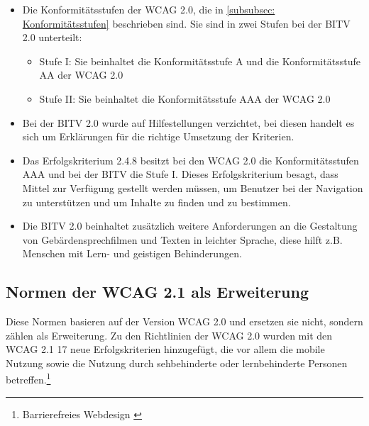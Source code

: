 \begin{itemize}
	\item Die Konformitätsstufen der \ac{WCAG} 2.0, die in \cref{subsubsec: Konformitätsstufen} beschrieben sind. Sie sind in zwei Stufen bei 
	der \ac{BITV} 2.0 unterteilt:
		\begin{itemize}
			\item Stufe I: Sie beinhaltet die Konformitätsstufe A und die Konformitätsstufe AA der \ac{WCAG} 2.0
			\item Stufe II: Sie beinhaltet die Konformitätsstufe AAA der \ac{WCAG} 2.0
		\end{itemize}
	
	\item Bei der \ac{BITV} 2.0 wurde auf Hilfestellungen verzichtet, bei diesen handelt es sich um Erklärungen für die richtige Umsetzung der Kriterien.
	
	\item Das Erfolgskriterium 2.4.8 besitzt bei den \ac{WCAG} 2.0 die Konformitätsstufen AAA und bei der \ac{BITV} die Stufe I. Dieses Erfolgskriterium besagt, dass 
	Mittel zur Verfügung gestellt werden müssen, um Benutzer bei der Navigation zu unterstützen und um Inhalte zu finden und zu bestimmen.
	
	\item Die \ac{BITV} 2.0 beinhaltet zusätzlich weitere Anforderungen an die Gestaltung von Gebärdensprechfilmen und Texten in leichter Sprache, diese hilft
	z.B. Menschen mit Lern- und geistigen Behinderungen.
\end{itemize}

\subsection{Normen der \ac{WCAG} 2.1 als Erweiterung}
\label{subsec: Normen der WCAG 2.1}

Diese Normen basieren auf der Version \ac{WCAG} 2.0 und ersetzen sie nicht, sondern zählen als Erweiterung. Zu den Richtlinien der \ac{WCAG} 2.0 wurden mit den \ac{WCAG} 2.1 17 neue Erfolgskriterien hinzugefügt, die vor allem die mobile Nutzung sowie die Nutzung durch sehbehinderte oder lernbehinderte Personen betreffen.\footnote{Barrierefreies Webdesign \cite{BarrierefreiesWebdesign}}

